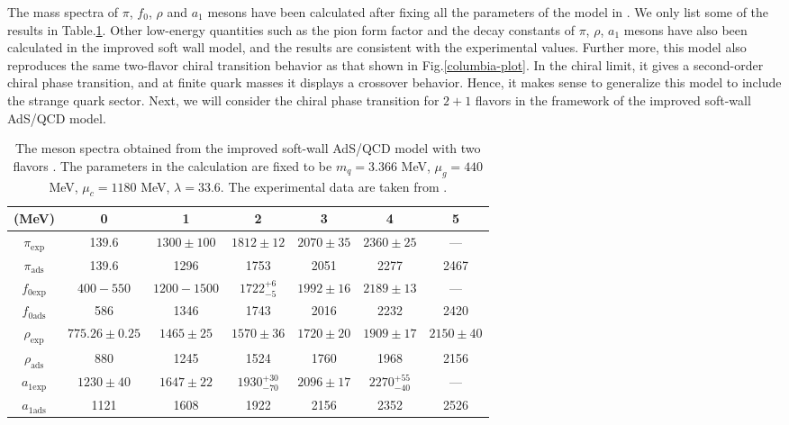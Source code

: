 \documentclass[11pt,a4paper,psfrag]{article}
\begin{document}
The mass spectra of $\pi$, $f_{0}$, $\rho$ and $a_{1}$ mesons have been calculated after fixing all the parameters of the model in \cite{Fang:2016nfj}. We only list some of the results in Table.\ref{2f-mesonspectra}. Other low-energy quantities such as the pion form factor and the decay constants of $\pi$, $\rho$, $a_{1}$ mesons have also been calculated in the improved soft wall model, and the results are consistent with the experimental values. Further more, this model also reproduces the same two-flavor chiral transition behavior as that shown in Fig.\ref{columbia-plot}. In the chiral limit, it gives a second-order chiral phase transition, and at finite quark masses it displays a crossover behavior. Hence, it makes sense to generalize this model to include the strange quark sector. Next, we will consider the chiral phase transition for $2+1$ flavors in the framework of the improved soft-wall AdS/QCD model.
\begin{table}\label{2f-mesonspectra}
\begin{center}
    \begin{tabular}{ccccccc}
       \hline\hline
        (MeV) & 0 & 1 & 2 & 3 & 4 & 5 \\
       \hline\hline
       $\pi_{\mathrm{exp}}$  & 139.6 & $1300\pm100$ & $1812\pm12$ & $2070\pm35$ & $2360\pm25$ & ---  \\
       \hline
       $\pi_{\mathrm{ads}}$  & 139.6 & 1296 & 1753 & 2051 & 2277 & 2467  \\
       \hline
       $f_{0\mathrm{exp}}$ & $400-550$ & $1200-1500$ & $1722^{+6}_{-5}$ & $1992 \pm 16$ & $2189 \pm 13$ & --- \\
       \hline
       $f_{0\mathrm{ads}}$ & 586 & 1346 & 1743 & 2016 & 2232 & 2420  \\
       \hline
       $\rho_{\mathrm{exp}}$  & $775.26\pm0.25$ & $1465\pm25$ & $1570\pm 36$ & $1720\pm 20$ & $1909\pm17$ & $2150\pm40$  \\
       \hline
       $\rho_{\mathrm{ads}}$  & 880 & 1245 & 1524 & 1760 & 1968 & 2156  \\
        \hline
       $a_{1\mathrm{exp}}$  & $1230\pm40$ & $1647\pm22$ & $1930^{+30}_{-70}$ & $2096\pm17$ & $2270^{+55}_{-40}$ & ---  \\
       \hline
       $a_{1\mathrm{ads}}$  & 1121 & 1608 & 1922 & 2156 & 2352 & 2526  \\
       \hline\hline
     \end{tabular}
\caption{The meson spectra obtained from the improved soft-wall AdS/QCD model with two flavors \cite{Fang:2016nfj}. The parameters in the calculation are fixed to be $m_{q}=3.366$ MeV, $\mu_g=440$ MeV, $\mu_c=1180$ MeV, $\lambda=33.6$. The experimental data are taken from \cite{Agashe:2014kda}.}
\end{center}
\end{table}
\end{document}
